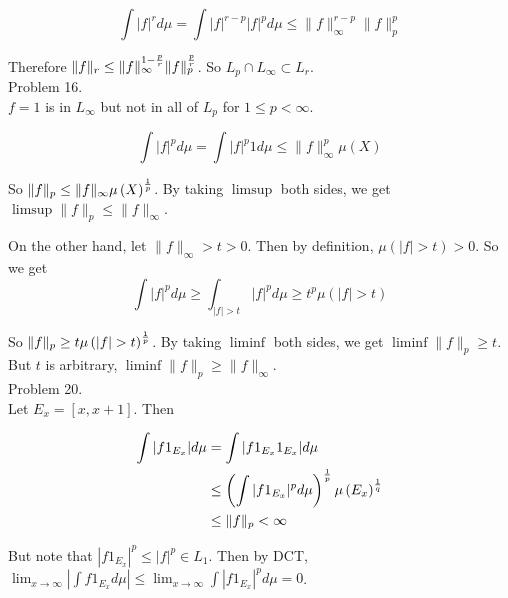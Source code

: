 \begin{equation*}
	\int |f|^r d\mu = \int |f|^{r-p} |f|^p d\mu \leq \| f \|_{\infty}^{r-p} \| f \|_p ^p
	\label{<+label+>}
\end{equation*}

Therefore $\| f \| _r \leq \| f \|_{\infty}^{1- {p\over r}} \| f \|_p ^{p\over r}$.
So $L_p \cap L_{\infty} \subset L_r$. \\

Problem 16. \\

$f=1$ is in $L_{\infty}$ but not in all of $L_p$ for $1\leq p < \infty$. 

\begin{equation*}
	\int |f|^p d\mu = \int |f|^p 1 d\mu \leq \|f \|_{\infty}^p \mu\left( X \right)
	\label{<+label+>}
\end{equation*}

So $\|f \|_p \leq \| f \|_{\infty} \mu\left( X \right)^{1\over p}$. By taking $\limsup$ both sides, we get $\limsup \| f \|_p \leq \| f \|_{\infty}$.

On the other hand, let $\| f \|_{\infty} > t > 0$. Then by definition, $\mu\left( |f| > t  \right) >0$. So we get 
\begin{equation*}
	\int |f|^p d\mu \geq \int_{|f| > t} |f|^p d\mu \geq t^p \mu\left( |f| > t \right)
	\label{<+label+>}
\end{equation*}

So $\|f \|_p \geq t \mu\left( |f| > t \right)^{1\over p}$. By taking $\liminf$ both sides, we get $\liminf \| f \|_p \geq t$. But $t$ is arbitrary, $\liminf \|f\|_p \geq \|f\|_{\infty}$. \\

Problem 20. \\

Let $E_x = \left[ x, x+1 \right]$. Then 

\begin{equation*}
	\begin{split}
		\int |f1_{E_x} | d\mu & = \int |f1_{E_x}1_{E_x}| d\mu \\
		& \leq \left ( \int |f 1_{E_x}|^p d\mu \right )^{1\over p} \mu\left( E_x \right)^{1\over q} \\
		& \leq \| f \|_p < \infty
	\end{split}
	\label{<+label+>}
\end{equation*}

But note that $|f 1_{E_x} |^p \leq |f|^p \in L_1$. Then by DCT, $\lim_{x\rightarrow \infty} \left | \int f 1_{E_x} d\mu \right | \leq \lim_{x\rightarrow \infty}\int | f 1_{E_x} |^p d\mu = 0$.\\


